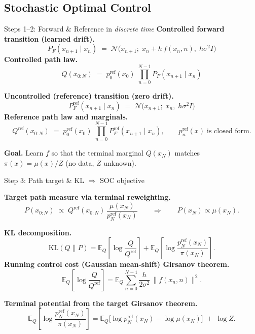 \documentclass[aspectratio=169,xcolor=dvipsnames]{beamer}
\begin{document}
\subsection{Stochastic Optimal Control}

\begin{frame}[t]{Steps 1--2: Forward \& Reference in \textit{discrete time}}
\footnotesize
\textbf{Controlled forward transition (learned drift).}
\[
P_F(x_{n+1}\mid x_n)\;=\;\mathcal N\!\big(x_{n+1};\;x_n + h\,f(x_n,n),\;h\sigma^2 I\big)
\]
\textbf{Controlled path law.}
\[
Q(x_{0:N})\;=\;p^{\text{ref}}_0(x_0)\;\prod_{n=0}^{N-1} P_F(x_{n+1}\mid x_n)
\]

\medskip
\textbf{Uncontrolled (reference) transition (zero drift).}
\[
P_F^{\text{ref}}(x_{n+1}\mid x_n)\;=\;\mathcal N\!\big(x_{n+1};\;x_n,\;h\sigma^2 I\big)
\]
\textbf{Reference path law and marginals.}
\[
Q^{\text{ref}}(x_{0:N})\;=\;p^{\text{ref}}_0(x_0)\;\prod_{n=0}^{N-1} P_F^{\text{ref}}(x_{n+1}\mid x_n),
\qquad p^{\text{ref}}_n(x)\;\text{is closed form.}
\]

\medskip
\textbf{Goal.} Learn $f$ so that the terminal marginal $Q(x_N)$ matches $\pi(x)=\mu(x)/Z$ (no data, $Z$ unknown).
\end{frame}

\begin{frame}[t]{Step 3: Path target \& KL $\Rightarrow$ SOC objective}
\scriptsize


\textbf{Target path measure via terminal reweighting.}
\[
P(x_{0:N}) \;\propto\; Q^{\text{ref}}(x_{0:N})\,\frac{\mu(x_N)}{p^{\text{ref}}_N(x_N)}
\qquad\Longrightarrow\qquad P(x_N)\propto\mu(x_N).
\]

\textbf{KL decomposition.}
\[
\mathrm{KL}(Q\|P)
=\mathbb E_{Q}\!\left[\log\frac{Q}{Q^{\text{ref}}}\right]
+\mathbb E_{Q}\!\left[\log\frac{p^{\text{ref}}_N(x_N)}{\pi(x_N)}\right].
\]
\medskip
\textbf{Running control cost (Gaussian mean-shift) Girsanov theorem.}
\[
\mathbb E_{Q}\!\left[\log\frac{Q}{Q^{\text{ref}}}\right]
=\mathbb E_Q \sum_{n=0}^{N-1}\frac{h}{2\sigma^2}\,\|f(x_n,n)\|^2.
\]

\textbf{Terminal potential from the target Girsanov theorem.}
\[
\mathbb E_{Q}\!\left[\log\frac{p^{\text{ref}}_N(x_N)}{\pi(x_N)}\right]
=\mathbb E_Q\!\big[\log p^{\text{ref}}_N(x_N)-\log \mu(x_N)\big]\;+\;\log Z.
\]

\end{frame}
\end{document}

